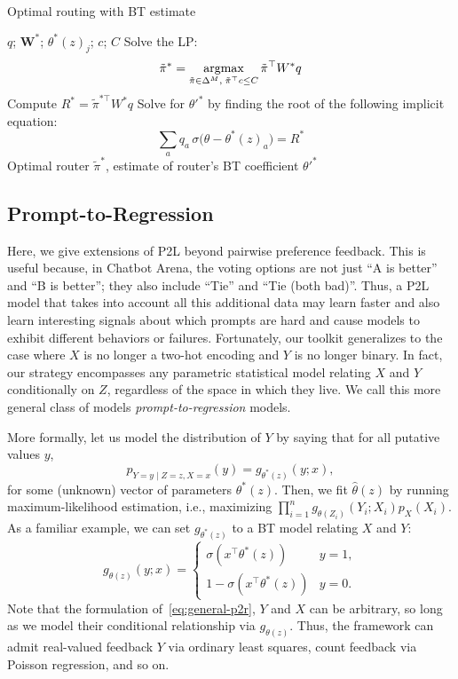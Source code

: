 \begin{algorithm}[H]
\caption{Optimal routing with BT estimate}
\begin{algorithmic}[1]
\REQUIRE $q$; $\mathbf{W}^*$; $\theta^*(z)_j$; $c$; $C$
\STATE Solve the LP:
\begin{equation}
\tilde\pi^* = \operatorname*{argmax}_{\tilde\pi \in \Delta^M, \; \tilde\pi^\top c \le C} \tilde\pi^\top W^* q
\end{equation}
\STATE Compute $R^* = \tilde\pi^{*\top} W^* q$
\STATE Solve for $\theta'^*$ by finding the root of the following implicit equation:
\begin{equation}
\sum_a q_a\,\sigma\bigl(\theta - \theta^*(z)_a\bigr) = R^*
\end{equation}
\ENSURE Optimal router $\tilde\pi^*$, estimate of router's BT coefficient $\theta'^*$
\end{algorithmic}
\label{alg:nested-problem}
\end{algorithm}


\subsection{Prompt-to-Regression}
\label{sec:p2r}

Here, we give extensions of P2L beyond pairwise preference feedback.
This is useful because, in Chatbot Arena, the voting options are not just ``A is better'' and ``B is better''; they also include ``Tie'' and ``Tie (both bad)''. Thus, a P2L model that takes into account all this additional data may learn faster and also learn interesting signals about which prompts are hard and cause models to exhibit different behaviors or failures.
Fortunately, our toolkit generalizes to the case where $X$ is no longer a two-hot encoding and $Y$ is no longer binary.
In fact, our strategy encompasses any parametric statistical model relating $X$ and $Y$ conditionally on $Z$, regardless of the space in which they live.
We call this more general class of models \emph{prompt-to-regression} models.

More formally, let us model the distribution of $Y$ by saying that for all putative values $y$, 
\begin{equation}
    \label{eq:general-p2r}
    p_{Y=y\mid Z=z, X=x}(y) = g_{\theta^*(z)}(y; x),
\end{equation}
for some (unknown) vector of parameters $\theta^*(z)$.
Then, we fit $\hat\theta(z)$ by running maximum-likelihood estimation, i.e., maximizing  $\prod\limits_{i=1}^ng_{\theta(Z_i)}(Y_i;X_i)p_X(X_i)$.
As a familiar example, we can set $g_{\theta^*(z)}$ to a BT model relating $X$ and $Y$:
\begin{equation}
    g_{\theta(z)}(y; x) = \begin{cases}
        \sigma(x^\top \theta^*(z)) & y = 1, \\
        1-\sigma(x^\top \theta^*(z)) & y = 0.
    \end{cases}
\end{equation}
Note that the formulation of~\eqref{eq:general-p2r}, $Y$ and $X$ can be arbitrary, so long as we model their conditional relationship via $g_{\theta(z)}$.
Thus, the framework can admit real-valued feedback $Y$ via ordinary least squares, count feedback via Poisson regression, and so on.

